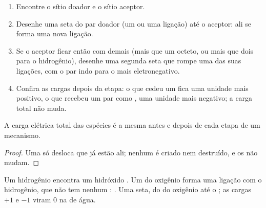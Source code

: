 \begin{method}\label{met:g12:curly-arrows:drawing}
\begin{enumerate}
  \item Encontre o sítio doador e o sítio aceptor.
  \item Desenhe uma seta do par doador (um  ou uma
        ligação) até o  aceptor: ali se forma uma nova ligação.
  \item Se o  aceptor ficar então com  demais (mais que um
        octeto, ou mais que dois para o hidrogênio), desenhe uma segunda
        seta que rompe uma das suas ligações, com o par indo para o 
        mais eletronegativo.
  \item Confira as cargas depois da etapa: o  que cedeu um  fica uma unidade mais positivo, o  que recebeu um
        par como , uma unidade mais negativo; a carga
        total não muda.
\end{enumerate}
\end{method}

\begin{proposition}\label{prop:g12:curly-arrows:charge}
A carga elétrica total das espécies é a mesma antes e depois de cada
etapa de um mecanismo.
\end{proposition}

\begin{proof}
Uma  só desloca  que já estão ali; nenhum  é
criado nem destruído, e os  não mudam.
\end{proof}

\begin{example}\label{ex:g12:curly-arrows:first}
Um  hidrogênio  encontra um  hidróxido . Um  do oxigênio forma uma ligação com o  hidrogênio, que não tem
nenhum : . Uma seta, do  do
oxigênio até o ; as cargas $+1$ e $-1$ viram 0 na  de
água.
\end{example}

